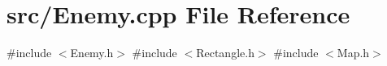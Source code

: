 \section{src/\+Enemy.cpp File Reference}
\label{_enemy_8cpp}
{\ttfamily \#include $<$Enemy.\+h$>$}\newline
{\ttfamily \#include $<$Rectangle.\+h$>$}\newline
{\ttfamily \#include $<$Map.\+h$>$}\newline

